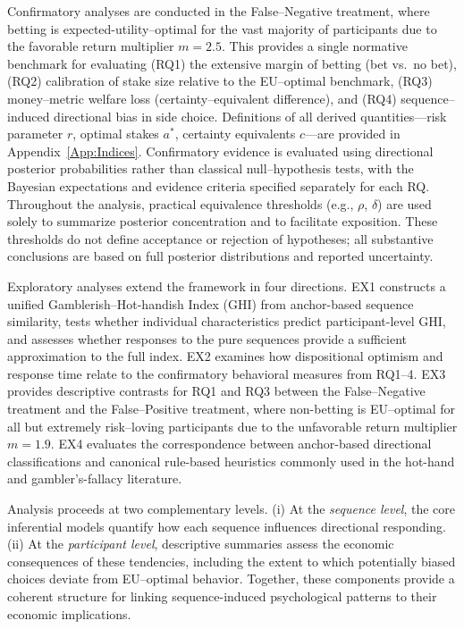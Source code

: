 \documentclass[11pt,a4paper]{article}
\numberwithin{equation}{section}
\begin{document}
Confirmatory analyses are conducted in the False--Negative treatment, where
betting is expected-utility--optimal for the vast majority of participants due
to the favorable return multiplier \(m = 2.5\). This provides a single normative
benchmark for evaluating  
(RQ1) the extensive margin of betting (bet vs.\ no bet),  
(RQ2) calibration of stake size relative to the EU--optimal benchmark,  
(RQ3) money--metric welfare loss (certainty--equivalent difference), and  
(RQ4) sequence--induced directional bias in side choice. 
Definitions of all derived quantities---risk parameter \(r\), optimal stakes
\(a^*\), certainty equivalents \(c\)---are provided in
Appendix~\ref{App:Indices}. Confirmatory evidence is evaluated using directional
posterior probabilities rather than classical null--hypothesis tests, with the
Bayesian expectations and evidence criteria specified separately for each RQ.
Throughout the analysis, practical equivalence thresholds (e.g., $\rho$, $\delta$) are used solely to summarize posterior concentration and to facilitate exposition. These thresholds do not define acceptance or rejection of hypotheses; all substantive conclusions are based on full posterior distributions and reported uncertainty.

Exploratory analyses extend the framework in four directions. 
EX1 constructs a unified Gamblerish–Hot-handish Index (GHI) from anchor-based sequence similarity, tests whether individual characteristics predict participant-level GHI, and assesses whether responses to the pure sequences provide a sufficient approximation to the full index.
EX2 examines how dispositional optimism and response time relate to the confirmatory behavioral measures from RQ1--4. 
EX3 provides descriptive contrasts for RQ1 and RQ3 between the False--Negative 
treatment and the False--Positive treatment, where non-betting is 
EU--optimal for all but extremely risk--loving participants due to the 
unfavorable return multiplier \(m = 1.9\).
EX4 evaluates the correspondence between anchor-based directional classifications and canonical rule-based heuristics commonly used in the hot-hand and gambler’s-fallacy literature.

Analysis proceeds at two complementary levels.
(i) At the \emph{sequence level}, the core inferential models quantify how each sequence influences directional responding.
(ii) At the \emph{participant level}, descriptive summaries assess the economic consequences of these tendencies, including the extent to which potentially biased choices deviate from EU–optimal behavior.
Together, these components provide a coherent structure for linking sequence-induced psychological patterns to their economic implications.
\end{document}
